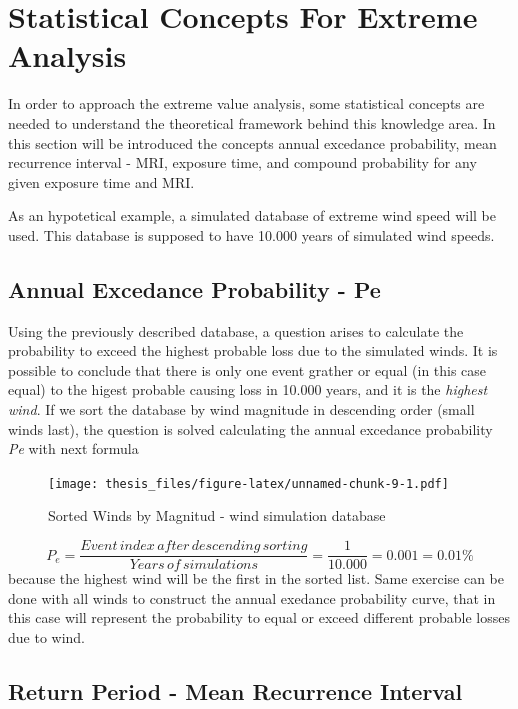 \documentclass[12pt,twoside]{reedthesis}
\begin{document}
\hypertarget{statistical-concepts-for-extreme-analysis}{%
\section{Statistical Concepts For Extreme Analysis}\label{statistical-concepts-for-extreme-analysis}}

In order to approach the extreme value analysis, some statistical concepts are needed to understand the theoretical framework behind this knowledge area. In this section will be introduced the concepts annual excedance probability, mean recurrence interval - MRI, exposure time, and compound probability for any given exposure time and MRI.

As an hypotetical example, a simulated database of extreme wind speed will be used. This database is supposed to have 10.000 years of simulated wind speeds.

\hypertarget{annual-excedance-probability---pe}{%
\subsection{Annual Excedance Probability - Pe}\label{annual-excedance-probability---pe}}

Using the previously described database, a question arises to calculate the probability to exceed the highest probable loss due to the simulated winds. It is possible to conclude that there is only one event grather or equal (in this case equal) to the higest probable causing loss in 10.000 years, and it is the \emph{highest wind}. If we sort the database by wind magnitude in descending order (small winds last), the question is solved calculating the annual excedance probability \emph{Pe} with next formula

\footnotesize
\begin{figure}
\centering
\texttt{[image: thesis\_files/figure-latex/unnamed-chunk-9-1.pdf]}
\caption{\label{fig:unnamed-chunk-9}Sorted Winds by Magnitud - wind simulation database}
\end{figure}
\normalsize

\[
P_e = \frac{Event\,index\,after\,descending\,sorting}{Years\,of\,simulations } = \frac{1}{10.000}=0.001=0.01\%
\]
because the highest wind will be the first in the sorted list. Same exercise can be done with all winds to construct the annual exedance probability curve, that in this case will represent the probability to equal or exceed different probable losses due to wind.

\hypertarget{return-period---mean-recurrence-interval}{%
\subsection{Return Period - Mean Recurrence Interval}\label{return-period---mean-recurrence-interval}}
\end{document}
